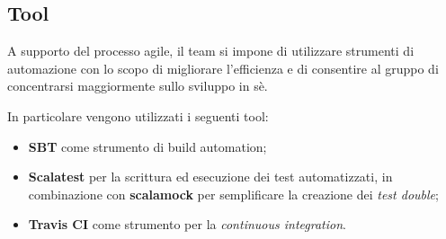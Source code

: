 \subsection{Tool}

A supporto del processo agile, il team si impone di utilizzare strumenti di automazione con lo scopo di migliorare l'efficienza e di consentire al gruppo di concentrarsi maggiormente sullo sviluppo in sè.

In particolare vengono utilizzati i seguenti tool:
%
\begin{itemize}
    \item \textbf{SBT} come strumento di build automation;
    \item \textbf{Scalatest} per la scrittura ed esecuzione dei test automatizzati, in combinazione con \textbf{scalamock} per semplificare la creazione dei \textit{test double};
    \item \textbf{Travis CI} come strumento per la \textit{continuous integration}.
\end{itemize}
